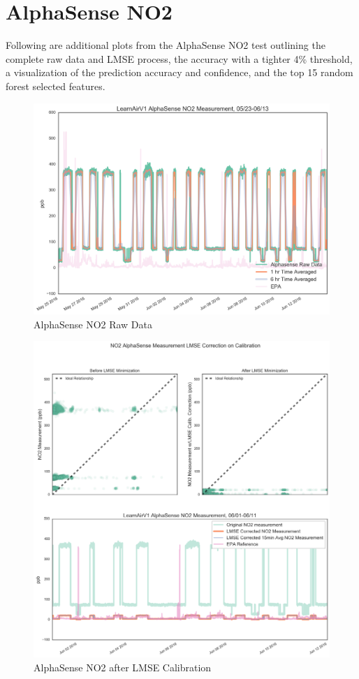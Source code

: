 \FloatBarrier
\section{AlphaSense NO2}
\FloatBarrier

Following are additional plots from the AlphaSense NO2 test outlining the complete raw data and LMSE process, the accuracy with a tighter 4\% threshold, a visualization of the prediction accuracy and confidence, and the top 15 random forest selected features.

\begin{figure}[htb]
 	\includegraphics[width=\textwidth]{figs/as_no2_raw}               
 	 \caption{AlphaSense NO2 Raw Data}
  	\label{fig:as_no2_raw}
\end{figure}

\begin{figure}[htb]
 	\includegraphics[width=\textwidth]{figs/as_no2_lmse}               
 	 \caption{AlphaSense NO2 after LMSE Calibration}
  	\label{fig:as_no2_lmse}
\end{figure}


